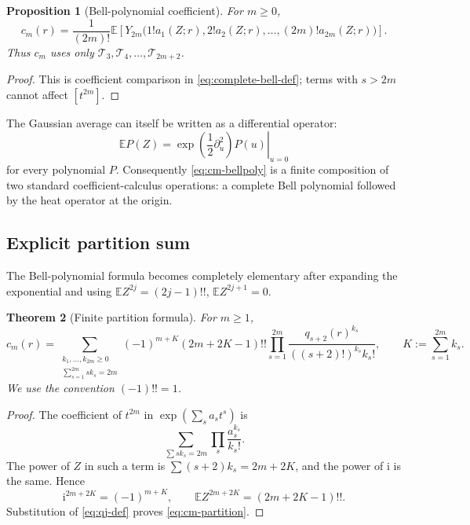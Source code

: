 \documentclass[11pt,a4paper]{article}
\newtheorem{theorem}{Theorem}[section]
\newtheorem{proposition}[theorem]{Proposition}
\theoremstyle{definition}
\theoremstyle{remark}
\newcommand{\Tch}{\mathscr T}
\newcommand{\E}{\mathbb E}
\newcommand{\ii}{\mathrm i}
\newcommand{\coef}[2]{[#1^{#2}]}
\begin{document}
\begin{proposition}[Bell-polynomial coefficient]\label{prop:bellpoly-cm}
For \(m\ge0\),
\begin{equation}\label{eq:cm-bellpoly}
 c_m(r)=\frac1{(2m)!}\E\!
 \left[
  Y_{2m}\bigl(1!a_1(Z;r),2!a_2(Z;r),\ldots,(2m)!a_{2m}(Z;r)\bigr)
 \right].
\end{equation}
Thus \(c_m\) uses only
\(\Tch_3,\Tch_4,\ldots,\Tch_{2m+2}\).
\end{proposition}

\begin{proof}
This is coefficient comparison in \cref{eq:complete-bell-def}; terms with
\(s>2m\) cannot affect \(\coef{t}{2m}\).
\end{proof}

The Gaussian average can itself be written as a differential operator:
\begin{equation}\label{eq:gaussian-heat}
 \E P(Z)=\left.\exp\!\left(\frac12\partial_u^2\right)P(u)\right|_{u=0}
\end{equation}
for every polynomial \(P\).  Consequently \cref{eq:cm-bellpoly} is a finite
composition of two standard coefficient-calculus operations: a complete Bell
polynomial followed by the heat operator at the origin.

\subsection{Explicit partition sum}

The Bell-polynomial formula becomes completely elementary after expanding the
exponential and using
\(\E Z^{2j}=(2j-1)!!\), \(\E Z^{2j+1}=0\).

\begin{theorem}[Finite partition formula]\label{thm:partition-cm}
For \(m\ge1\),
\begin{equation}\label{eq:cm-partition}
 \boxed{
 c_m(r)=
 \sum_{\substack{k_1,\ldots,k_{2m}\ge0\\
                   \sum_{s=1}^{2m}s k_s=2m}}
 (-1)^{m+K}(2m+2K-1)!!
 \prod_{s=1}^{2m}
 \frac{q_{s+2}(r)^{k_s}}{((s+2)!)^{k_s}k_s!},}
 \qquad K:=\sum_{s=1}^{2m}k_s.
\end{equation}
We use the convention \((-1)!!=1\).
\end{theorem}

\begin{proof}
The coefficient of \(t^{2m}\) in
\(\exp(\sum_sa_st^s)\) is
\[
 \sum_{\sum sk_s=2m}\prod_s\frac{a_s^{k_s}}{k_s!}.
\]
The power of \(Z\) in such a term is
\(\sum(s+2)k_s=2m+2K\), and the power of \(\ii\) is the same.  Hence
\[
 \ii^{2m+2K}=(-1)^{m+K},
 \qquad
 \E Z^{2m+2K}=(2m+2K-1)!!.
\]
Substitution of \cref{eq:qj-def} proves \cref{eq:cm-partition}.
\end{proof}
\end{document}
